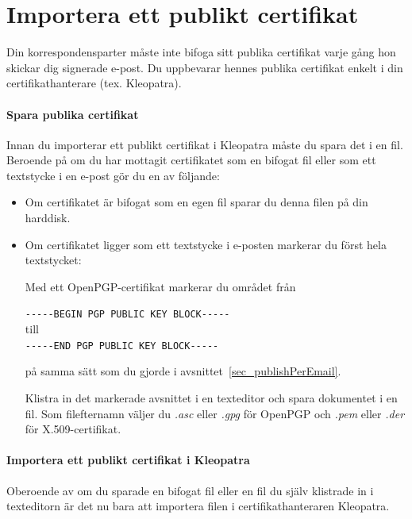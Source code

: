 \documentclass[a4paper,11pt, oneside,openright,titlepage,dvips]{scrbook}
\newcounter{part}
\newcounter{chapter}
\newcounter{section}[chapter]
\begin{document}
\clearpage
\chapter{Importera ett publikt certifikat}
\label{ch:importCertificate}

Din korrespondensparter måste inte bifoga sitt publika certifikat varje gång
hon skickar dig signerade e-post.
Du uppbevarar hennes publika certifikat enkelt i din
certifikathanterare (tex. Kleopatra).


\subsubsection{Spara publika certifikat}

Innan du importerar ett publikt certifikat i Kleopatra måste du
spara det i en fil. Beroende på om du har mottagit certifikatet
som en bifogat fil eller som ett textstycke i en e-post gör du
en av följande:

\begin{itemize}
\item Om certifikatet är bifogat som en egen fil sparar du
    denna filen på din harddisk.

\item Om certifikatet ligger som ett textstycke i e-posten markerar
    du först hela textstycket:

Med ett OpenPGP-certifikat markerar du området från

\verb+-----BEGIN PGP PUBLIC KEY BLOCK-----+\\
till\\
\verb+-----END PGP PUBLIC KEY BLOCK-----+

på samma sätt som du gjorde i avsnittet~\ref{sec_publishPerEmail}.

Klistra in det markerade avsnittet i en texteditor och spara
dokumentet i en fil. Som filefternamn väljer du 
\textit{.asc} eller \textit{.gpg} för OpenPGP och
\textit{.pem} eller \textit{.der} för X.509-certifikat.

\end{itemize}

\clearpage
\subsubsection{Importera ett publikt certifikat i Kleopatra}

Oberoende av om du sparade en bifogat fil eller en fil du själv 
klistrade in i texteditorn är det nu bara att importera filen i
certifikathanteraren Kleopatra.
\end{document}
